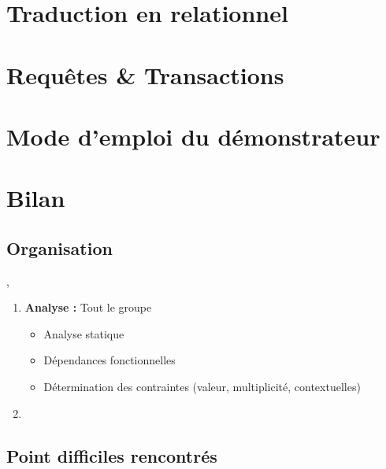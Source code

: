 \documentclass[a4paper, 10pt]{article} %
\begin{document}
\section{Traduction en relationnel} %

\section{Requêtes \& Transactions}

\section{Mode d'emploi du démonstrateur}

\section{Bilan}
\subsection{Organisation},
\begin{enumerate}
    \item \textbf{Analyse :} Tout le groupe
    \begin{itemize}
        \item Analyse statique
        \item Dépendances fonctionnelles
        \item Détermination des contraintes (valeur, multiplicité, contextuelles)
    \end{itemize}
    \item 
\end{enumerate}
\subsection{Point difficiles rencontrés}
\end{document}

